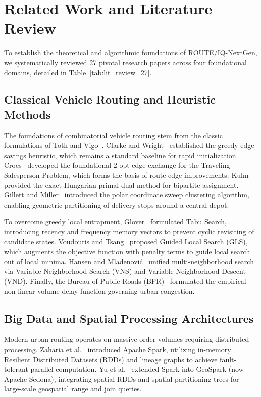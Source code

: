 \section{Related Work and Literature Review}
\label{sec:related_work}
To establish the theoretical and algorithmic foundations of ROUTE/IQ-NextGen, we systematically reviewed 27 pivotal research papers across four foundational domains, detailed in Table~\ref{tab:lit_review_27}.

\subsection{Classical Vehicle Routing and Heuristic Methods}
The foundations of combinatorial vehicle routing stem from the classic formulations of Toth and Vigo~\cite{toth2014vehicle}. Clarke and Wright~\cite{clarke1964scheduling} established the greedy edge-savings heuristic, which remains a standard baseline for rapid initialization. Croes~\cite{croes1958method} developed the foundational 2-opt edge exchange for the Traveling Salesperson Problem, which forms the basis of route edge improvements. Kuhn~\cite{kuhn1955hungarian} provided the exact Hungarian primal-dual method for bipartite assignment. Gillett and Miller~\cite{gillett1974sweep} introduced the polar coordinate sweep clustering algorithm, enabling geometric partitioning of delivery stops around a central depot. 

To overcome greedy local entrapment, Glover~\cite{glover1986future} formulated Tabu Search, introducing recency and frequency memory vectors to prevent cyclic revisiting of candidate states. Voudouris and Tsang~\cite{voudouris1999guided} proposed Guided Local Search (GLS), which augments the objective function with penalty terms to guide local search out of local minima. Hansen and Mladenovi{\'c}~\cite{hansen2001variable} unified multi-neighborhood search via Variable Neighborhood Search (VNS) and Variable Neighborhood Descent (VND). Finally, the Bureau of Public Roads (BPR)~\cite{bpr1964traffic} formulated the empirical non-linear volume-delay function governing urban congestion.

\subsection{Big Data and Spatial Processing Architectures}
Modern urban routing operates on massive order volumes requiring distributed processing. Zaharia et al.~\cite{zaharia2016apache} introduced Apache Spark, utilizing in-memory Resilient Distributed Datasets (RDDs) and lineage graphs to achieve fault-tolerant parallel computation. Yu et al.~\cite{yu2015geospark} extended Spark into GeoSpark (now Apache Sedona), integrating spatial RDDs and spatial partitioning trees for large-scale geospatial range and join queries.


